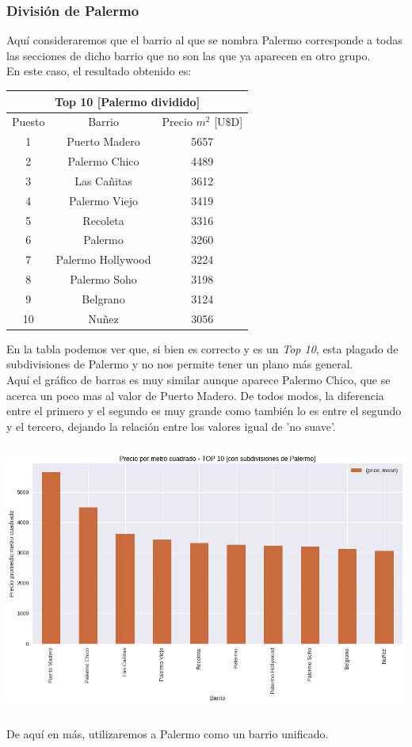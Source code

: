 \documentclass[a4paper, 10pt]{article}
\newcommand\tab[1][0.5cm]{\hspace*{#1}}
\begin{document}
			  	\subsubsection{División de Palermo}
			  		Aquí consideraremos que el barrio al que se nombra Palermo corresponde a todas las secciones de dicho
			  		barrio que no son las que ya aparecen en otro grupo. \\
			  		\tab En este caso, el resultado obtenido es:
			  		\begin{center}
						\begin{tabular}{ |c|c|c| }
							\hline
							\multicolumn{3}{|c|}{Top 10 [Palermo dividido]}\\
							\hline
							Puesto & Barrio & Precio $m^2$ [U$\$$D] \\
							\hline
							1 & Puerto Madero & 5657 \\
							2 & Palermo Chico & 4489 \\
							3 & Las Cañitas & 3612  \\
							4 & Palermo Viejo & 3419 \\
							5 & Recoleta & 3316 \\
							6 & Palermo & 3260 \\
							7 & Palermo Hollywood & 3224 \\
							8 & Palermo Soho & 3198 \\
							9 & Belgrano & 3124 \\
							10 & Nuñez & 3056 \\
							\hline
						\end{tabular}
					\end{center}
					\tab En la tabla podemos ver que, si bien es correcto y es un \emph{Top 10}, esta plagado de subdivisiones
					de Palermo y no nos permite tener un plano más general. \\
					\tab Aquí el gráfico de barras es muy similar aunque aparece Palermo Chico, que se acerca un poco mas
					al valor de Puerto Madero. De todos modos, la diferencia entre el primero y el segundo es muy grande
					como también lo es entre el segundo y el tercero, dejando la relación entre los valores igual de 'no suave'.
					\begin{center}
   	    					\includegraphics[width=7in, height=3.5in]{images/m2NotUnifiedTop10}
			  		\end{center}
			  		\tab De aquí en más, utilizaremos a Palermo como un barrio unificado.
\end{document}
